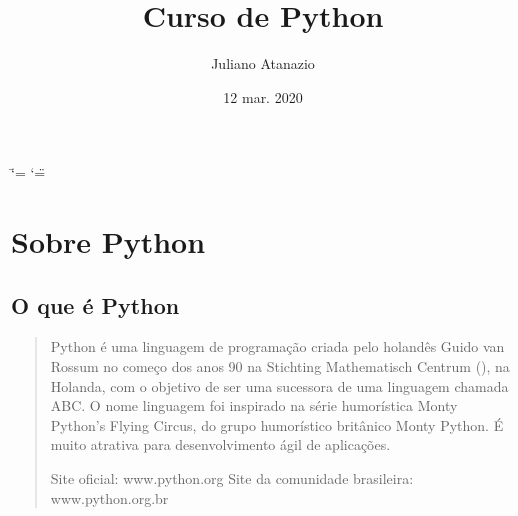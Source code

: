 \documentclass[letterpaper,10pt,brazil]{sphinxmanual}
\title{Curso de Python}
\date{12 mar. 2020}
\author{Juliano Atanazio}
\begin{document}
\ifdefined\shorthandoff
  \ifnum\catcode`\=\string=\active\shorthandoff{=}\fi
  \ifnum\catcode`\"=\active{}\fi
\fi

\pagestyle{empty}
\sphinxmaketitle
\pagestyle{plain}
\sphinxtableofcontents
\pagestyle{normal}
\label{\detokenize{index::doc}}



\chapter{Sobre Python}
\label{\detokenize{content/about:sobre-python}}\label{\detokenize{content/about::doc}}

\section{O que é Python}
\label{\detokenize{content/about:o-que-e-python}}\begin{quote}

Python é uma linguagem de programação criada pelo holandês Guido van Rossum no começo dos anos 90 na Stichting Mathematisch Centrum (), na Holanda, com o objetivo de ser uma sucessora de uma linguagem chamada ABC.
O nome linguagem foi inspirado na série humorística Monty Python’s Flying Circus, do grupo humorístico britânico Monty Python.
É muito atrativa para desenvolvimento ágil de aplicações.

Site oficial: www.python.org
Site da comunidade brasileira: www.python.org.br
\end{quote}
\end{document}
